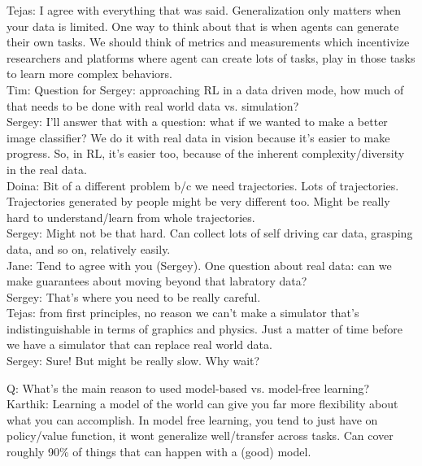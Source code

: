 Tejas: I agree with everything that was said. Generalization only matters when your data is limited. One way to think about that is when agents can generate their own tasks. We should think of metrics and measurements which incentivize researchers and platforms where agent can create lots of tasks, play in those tasks to learn more complex behaviors. \\

Tim: Question for Sergey: approaching RL in a data driven mode, how much of that needs to be done with real world data vs. simulation? \\

Sergey: I'll answer that with a question: what if we wanted to make a better image classifier? We do it with real data in vision because it's easier to make progress. So, in RL, it's easier too, because of the inherent complexity/diversity in the real data. \\

Doina: Bit of a different problem b/c we need trajectories. Lots of trajectories. Trajectories generated by people might be very different too. Might be really hard to understand/learn from whole trajectories. \\

Sergey: Might not be that hard. Can collect lots of self driving car data, grasping data, and so on, relatively easily. \\

Jane: Tend to agree with you (Sergey). One question about real data: can we make guarantees about moving beyond that labratory data? \\

Sergey: That's where you need to be really careful. \\

Tejas: from first principles, no reason we can't make a simulator that's indistinguishable in terms of graphics and physics. Just a matter of time before we have a simulator that can replace real world data. \\

Sergey: Sure! But might be really slow. Why wait? \\

\spacerule

Q: What's the main reason to used model-based vs. model-free learning? \\

Karthik: Learning a model of the world can give you far more flexibility about what you can accomplish. In model free learning, you tend to just have on policy/value function, it wont generalize well/transfer across tasks. Can cover roughly 90\% of things that can happen with a (good) model. \\

